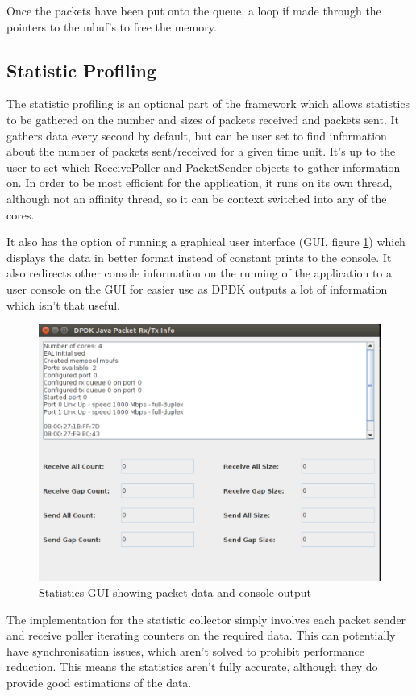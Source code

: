 \documentclass[final_report.tex]{subfiles}
\begin{document}
Once the packets have been put onto the queue, a loop if made through the pointers to the mbuf's to free the memory.

\subsection{Statistic Profiling}
The statistic profiling is an optional part of the framework which allows statistics to be gathered on the number and sizes of packets received and packets sent. It gathers data every second by default, but can be user set to find information about the number of packets sent/received for a given time unit. It's up to the user to set which ReceivePoller and PacketSender objects to gather information on. In order to be most efficient for the application, it runs on its own thread, although not an affinity thread, so it can be context switched into any of the cores.

It also has the option of running a graphical user interface (GUI, figure \ref{fig:gui}) which displays the data in better format instead of constant prints to the console. It also redirects other console information on the running of the application to a user console on the GUI for easier use as DPDK outputs a lot of information which isn't that useful.

\begin{figure}[H]
	\centering
	\includegraphics[width=\textwidth]{img/gui.png}
	\caption{Statistics GUI showing packet data and console output}
	\label{fig:gui}
\end{figure}

The implementation for the statistic collector simply involves each packet sender and receive poller iterating counters on the required data. This can potentially have synchronisation issues, which aren't solved to prohibit performance reduction. This means the statistics aren't fully accurate, although they do provide good estimations of the data.
\end{document}
